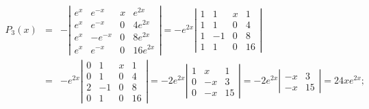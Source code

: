 \documentclass[dvips]{book}
\numberwithin{example}{section}
\numberwithin{equation}{section}
\numberwithin{theorem}{section}
\numberwithin{table}{section}
\numberwithin{figure}{section}
\begin{document}
\begin{eqnarray*}
P_3(x)&=&
-\left|\begin{array}{crcc}
e^x&e^{-x}&x&e^{2x}\\
e^x&e^{-x}&0&4e^{2x}\\
e^x&-e^{-x}&0&8e^{2x}\\
e^x&e^{-x}&0&16e^{2x}
\end{array}\right|=
-e^{2x}\left|\begin{array}{crcc}
1&1&x&1\\
1&1&0&4\\
1&-1&0&8\\
1&1&0&16
\end{array}\right|\\
&=&-e^{2x}\left|\begin{array}{crcc}
0&1&x&1\\
0&1&0&4\\
2&-1&0&8\\
0&1&0&16
\end{array}\right|
=-2e^{2x}\left|\begin{array}{crcc}
1&x&1\\
0&-x&3\\
0&-x&15
\end{array}\right|
=-2e^{2x}\left|\begin{array}{crcc}
-x&3\\
-x&15
\end{array}\right|=24xe^{2x};
\end{eqnarray*}
\end{document}
